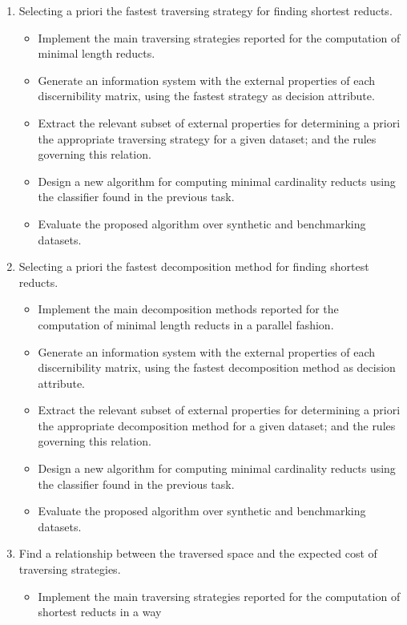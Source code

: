\documentclass[authoryear,11pt]{elsarticle}
\begin{document}
\begin{enumerate}
  	\item Selecting a priori the fastest traversing strategy for finding shortest reducts.
	\begin{itemize}
  		\item Implement the main traversing strategies reported for the computation of minimal length reducts.
  		\item Generate an information system with the external properties of each discernibility matrix, using 
  			  the fastest strategy as decision attribute.
  		\item Extract the relevant subset of external properties for determining a priori the appropriate 
  			  traversing strategy for a given dataset; and the rules governing this relation.
  		\item Design a new algorithm for computing minimal cardinality reducts using the classifier found in
  			  the previous task.
  		\item Evaluate the proposed algorithm over synthetic and benchmarking datasets.
  	\end{itemize}
  	\item Selecting a priori the fastest decomposition method for finding shortest reducts.
	\begin{itemize}
  		\item Implement the main decomposition methods reported for the computation of minimal length reducts
  			  in a parallel fashion.
  		\item Generate an information system with the external properties of each discernibility matrix, using 
  			  the fastest decomposition method as decision attribute.
  		\item Extract the relevant subset of external properties for determining a priori the appropriate 
  			  decomposition method for a given dataset; and the rules governing this relation.
  		\item Design a new algorithm for computing minimal cardinality reducts using the classifier 
  			  found in the previous task.
  		\item Evaluate the proposed algorithm over synthetic and benchmarking datasets.
  	\end{itemize}
  	\item Find a relationship between the traversed space and the expected cost of traversing strategies.
  	\begin{itemize}
  		\item Implement the main traversing strategies reported for the computation of shortest reducts in a way

\end{itemize}
\end{enumerate}
\end{document}
